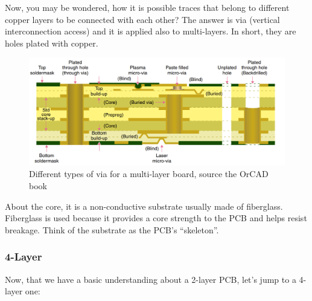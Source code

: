 \documentclass[final]{cubedoc}
\begin{document}
	Now, you may be wondered, how it is possible traces that belong to different copper layers to be connected with each other? The answer is via (vertical interconnection access) and it is applied also to multi-layers. In short, they are holes plated with copper.
	
	\begin{figure}[h!]
		\centering
		\includegraphics[width=\textwidth, height=.25\textheight]{assets/via.png}
		\caption{Different types of via for a multi-layer board, source the OrCAD book}
	\end{figure}
	
	About the core, it is a non-conductive substrate usually made of fiberglass. Fiberglass is used because it provides a core strength to the PCB and helps resist breakage. Think of the substrate as the PCB’s “skeleton”. 
	
	\subsubsection{4-Layer}
	Now, that we have a basic understanding about a 2-layer PCB, let’s jump to a 4-layer one:
	
\end{document}
